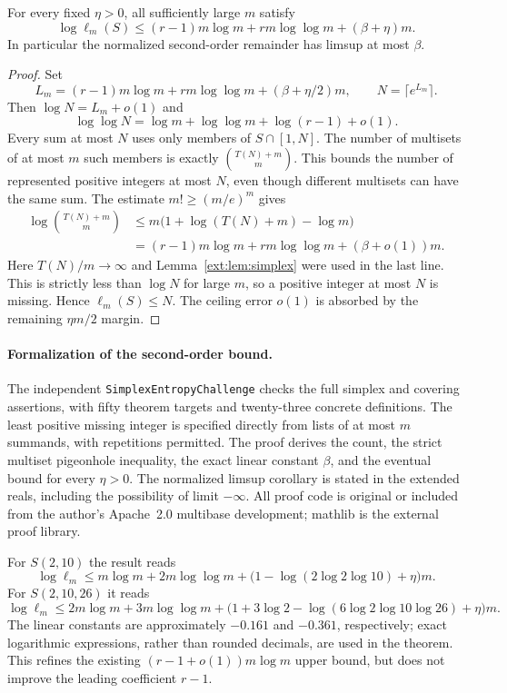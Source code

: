 \begin{theorem}\label{ext:thm:entropy}
For every fixed $\eta>0$, all sufficiently large $m$ satisfy
\begin{equation}\label{ext:eq:entropy}
\log\ell_m(S)\le(r-1)m\log m+rm\log\log m+(\beta+\eta)m.
\end{equation}
In particular the normalized second-order remainder has limsup at most
$\beta$.
\end{theorem}
\begin{proof}
Set
\[
L_m=(r-1)m\log m+rm\log\log m+(\beta+\eta/2)m,
\qquad N=\lceil e^{L_m}\rceil.
\]
Then $\log N=L_m+o(1)$ and
\[
\log\log N=\log m+\log\log m+\log(r-1)+o(1).
\]
Every sum at most $N$ uses only members of $S\cap[1,N]$. The number
of multisets of at most $m$ such members is exactly $\binom{T(N)+m}{m}$.
This bounds the number of represented positive integers at most $N$,
even though different multisets can have the same sum.
The estimate $m!\ge(m/e)^m$ gives
\begin{align*}
\log\binom{T(N)+m}{m}
&\le m\bigl(1+\log(T(N)+m)-\log m\bigr)\\
&=(r-1)m\log m+rm\log\log m+(\beta+o(1))m.
\end{align*}
Here $T(N)/m\to\infty$ and Lemma~\ref{ext:lem:simplex} were used in the
last line. This is strictly less than $\log N$ for large $m$, so a
positive integer at most $N$ is missing. Hence $\ell_m(S)\le N$.
The ceiling error $o(1)$ is absorbed by the remaining $\eta m/2$ margin.
\end{proof}

\paragraph{Formalization of the second-order bound.}
The independent \texttt{SimplexEntropyChallenge} checks the full simplex
and covering assertions, with fifty theorem targets and twenty-three
concrete definitions. The least positive missing integer is specified
directly from lists of at most $m$ summands, with repetitions permitted.
The proof derives the count, the strict multiset pigeonhole inequality,
the exact linear constant $\beta$, and the eventual bound for every
$\eta>0$. The normalized limsup corollary is stated in the extended
reals, including the possibility of limit $-\infty$. All proof code is
original or included from the author's Apache~2.0 multibase development;
mathlib is the external proof library.


For $S(2,10)$ the result reads
\[
\log\ell_m\le m\log m+2m\log\log m+
\bigl(1-\log(2\log2\log10)+\eta\bigr)m.
\]
For $S(2,10,26)$ it reads
\[
\log\ell_m\le2m\log m+3m\log\log m+
\bigl(1+3\log2-\log(6\log2\log10\log26)+\eta\bigr)m.
\]
The linear constants are approximately $-0.161$ and $-0.361$,
respectively; exact logarithmic expressions, rather than rounded decimals,
are used in the theorem. This refines the existing $(r-1+o(1))m\log m$
upper bound, but does not improve the leading coefficient $r-1$.

